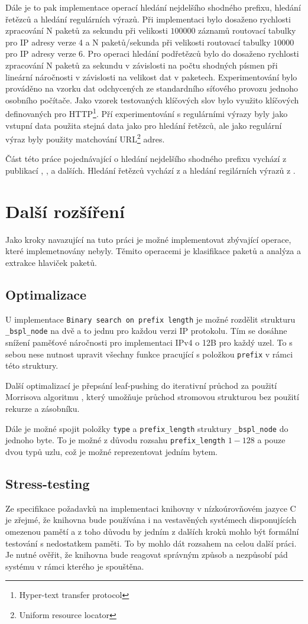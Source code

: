 Dále je to pak implementace operací hledání nejdelšího shodného prefixu, hledání řetězců
a hledání regulárních výrazů. Při implementaci bylo dosaženo rychlosti zpracování N paketů za sekundu
při velikosti $100000$ záznamů routovací tabulky pro IP adresy verze 4 a N paketů/sekunda při velikosti
routovací tabulky $10000$ pro IP adresy verze 6. Pro operaci hledání podřetězců bylo
do dosaženo rychlosti zpracování N paketů za sekundu v závislosti na počtu shodných písmen
při lineární náročnosti v závislosti na velikost dat v paketech. Experimentování bylo prováděno
na vzorku dat odchycených ze standardního síťového provozu jednoho osobního počítače. Jako vzorek
testovaných klíčových slov bylo využito klíčových definovaných pro HTTP\footnote{Hyper-text transfer protocol}.
Pří experimentování s regulárními výrazy byly jako vstupní data použita stejná data jako pro hledání řetězců,
ale jako regulární výraz byly použity matchování URL\footnote{Uniform resource locator} adres.

Část této práce pojednávající o hledání nejdelšího shodného prefixu vychází z publikací
\cite{tbm}, \cite{bspl}, a dalších. Hledání řetězců vychází z \cite{aho} a hledání regilárních výrazů
 z \cite{}.

\section{Další rozšíření}
Jako kroky navazující na tuto práci je možné implementovat zbývající operace, které implemetnovány nebyly.
Těmito operacemi je klasifikace paketů a analýza a extrakce hlaviček paketů.

\subsection{Optimalizace}
U implementace \texttt{Binary search on prefix length} je možné rozdělit strukturu \texttt{\_bspl\_node}
na dvě a to jednu pro každou verzi IP protokolu. Tím se dosáhne snížení paměťové náročnosti
pro implementaci IPv4 o 12B pro každý uzel. To s sebou nese nutnost upravit všechny funkce pracující
s položkou \texttt{prefix} v rámci této struktury.

Další optimalizací je přepsání leaf-pushing do iterativní průchod za použití Morrisova algoritmu \cite{morris},
který umožňuje průchod stromovou strukturou bez použití rekurze a zásobníku.

Dále je možné spojit položky \texttt{type} a \texttt{prefix\_length} struktury \texttt{\_bspl\_node}
do jednoho byte. To je možné z důvodu rozsahu \texttt{prefix\_length} $1-128$ a pouze dvou typů uzlu,
což je možné reprezentovat jedním bytem.

\subsection{Stress-testing}
Ze specifikace požadavků na implementaci knihovny v nízkoúrovňovém jazyce C je zřejmé,
že knihovna bude používána i na vestavěných systémech disponujících omezenou pamětí a z toho
důvodu by jedním z dalších kroků mohlo být formální testování s nedostatkem paměti.
To by mohlo dát rozsahem na celou další práci. Je nutné ověřit, že knihovna bude
reagovat správným způsob a nezpůsobí pád systému v rámci kterého je spouštěna.
